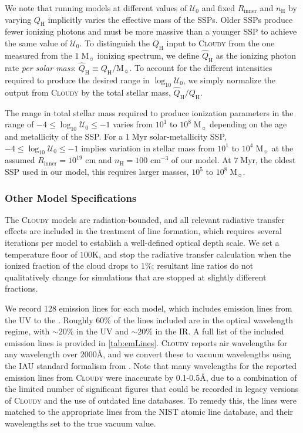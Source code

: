 \documentclass[linenumbers, trackchanges, tighten]{aastex61}%
\newcommand{\Tab}[1]{\autoref{tab:#1}}
\newcommand{\Cloudy}{\textsc{Cloudy}\xspace}
\newcommand{\logten}{\ensuremath{\log_{10}}}
\newcommand\Msun{\ensuremath{\mathrm{M_{\sun}}}}
\newcommand{\nH}{\ensuremath{n_{\mathrm{H}}}}
\newcommand{\cm}[1]{\ensuremath{\mathrm{cm}^{#1}}}
\newcommand{\ang}{\ensuremath{\mbox{\AA}}}
\newcommand{\Rin}{\ensuremath{R_{\mathrm{inner}}}}
\newcommand{\QH}{\ensuremath{Q_{\mathrm{H}}}}
\newcommand{\QHat}{\ensuremath{\hat{Q}_{\mathrm{H}}}}
\newcommand{\U}{\ensuremath{\mathcal{U}_{0}}}
\newcommand{\logU}{\ensuremath{\logten \mathcal{U}_0}}
\begin{document}
We note that running models at different values of \U{} and fixed \Rin{} and \nH{} by varying \QH{} implicitly varies the effective mass of the SSPs. Older SSPs produce fewer ionizing photons and must be more massive than a younger SSP to achieve the same value of \U{}. To distinguish the \QH{} input to \Cloudy from the one measured from the $1\;\Msun$ ionizing spectrum, we define \QHat{} as the ionizing photon rate \emph{per solar mass}: $\QHat \equiv \QH/\Msun$. To account for the different intensities required to produce the desired range in \logU{}, we simply normalize the output from \Cloudy by the total stellar mass, $\QHat/\QH$. 

The range in total stellar mass required to produce ionization parameters in the range of $-4 \leq \logU \leq -1$ varies from $10^1$ to $10^8\;\Msun$ depending on the age and metallicity of the SSP. For a $1\;$Myr solar-metallicity SSP, $-4 \leq \logU \leq -1$ implies variation in stellar mass from $10^1$ to $10^4\;\Msun$ at the assumed $\Rin{} = 10^{19}$ cm and $\nH=100$ \cm{-3} of our model. At $7\;$Myr, the oldest SSP used in our model, this requires larger masses, $10^5$ to $10^8\;\Msun$.

\subsubsection{Other Model Specifications}\label{sec:methods:cloudy:other}

The \Cloudy models are radiation-bounded, and all relevant radiative transfer effects are included in the treatment of line formation, which requires several iterations per model to establish a well-defined optical depth scale. We set a temperature floor of $100$K, and stop the radiative transfer calculation when the ionized fraction of the cloud drops to 1\%; resultant line ratios do not qualitatively change for simulations that are stopped at slightly different fractions.

We record 128 emission lines for each model, which includes emission lines from the UV to the . Roughly 60\% of the lines included are in the optical wavelength regime, with ${\sim20}\%$ in the UV and ${\sim}20\%$ in the IR. A full list of the included emission lines is provided in \Tab{emLines}. \Cloudy reports air wavelengths for any wavelength over $2000\ang$, and we convert these to vacuum wavelengths using the IAU standard formalism from \citet{Morton1991}. Note that many wavelengths for the reported emission lines from \Cloudy were inaccurate by 0.1-0.5\AA, due to a combination of the limited number of significant figures that could be recorded in legacy versions of \Cloudy and the use of outdated line databases. To remedy this, the lines were matched to the appropriate lines from the NIST atomic line database, and their wavelengths set to the true vacuum value.
\end{document}
